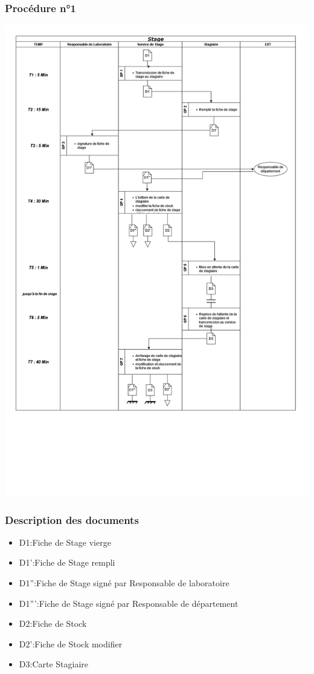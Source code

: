 \subsubsection*{Procédure n°1}
\includegraphics[width=1\textwidth]{chapter/Study of the Existing/EP/stage.png}
\subsubsection*{Description des documents}
\begin{itemize}
    \item D1:Fiche de Stage vierge
    \item D1':Fiche de Stage rempli
    \item D1'':Fiche de Stage signé par Responsable de laboratoire
    \item D1''':Fiche de Stage signé par Responsable de département
    \item D2:Fiche de Stock
    \item D2':Fiche de Stock modifier
    \item D3:Carte Stagiaire
\end{itemize}

